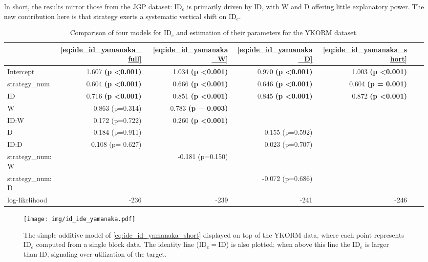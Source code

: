 \documentclass[acmlarge, manuscript,review]{acmart}
\newcommand{\ide}{\ensuremath{{\text{ID}_e}}\xspace}
\begin{document}
In short, the results mirror those from the JGP dataset: \ide is primarily driven by ID, with W and D offering little explanatory power. The new contribution here is that strategy exerts a systematic vertical shift on \ide.



\begin{table}[htbp]
\begin{center}
	\caption{Comparison of four models for \ide and estimation of their parameters for the YKORM dataset.}
	\label{tab:ide_id_yamanaka}
	\begin{tabular}{lrrrrrr}
	\hline
				  &  \autoref{eq:ide_id_yamanaka_full} & \autoref{eq:ide_id_yamanaka_W} &      \autoref{eq:ide_id_yamanaka_D} & \autoref{eq:ide_id_yamanaka_short} \\
	\hline
	Intercept     &  1.607 \textbf{(p \textless 0.001)} &    1.034 \textbf{(p \textless 0.001)} &  0.970 \textbf{(p \textless 0.001)} &  1.003 \textbf{(p \textless 0.001)}\\
	strategy\_num &  0.604 \textbf{(p \textless 0.001)} &    0.666 \textbf{(p \textless 0.001)} & 0.646 \textbf{(p \textless 0.001)} & 0.604 \textbf{(p = 0.001)} \\
	ID            &  0.716  \textbf{(p \textless 0.001)} &    0.851 \textbf{(p \textless 0.001)} & 0.845 \textbf{(p \textless 0.001)}& 0.872 \textbf{(p \textless 0.001)}  \\
	W             & -0.863 (p=0.314) &  -0.783 \textbf{(p = 0.003)}   &  &    \\
	ID:W          &  0.172 (p=0.722) &    0.260 \textbf{(p \textless 0.001)} &    &        \\
	D             & -0.184 (p=0.911)&     & 0.155 (p=0.592) &  \\
	ID:D          &  0.108 (p= 0.627) &     &  0.023 (p=0.707) &    \\
	strategy\_num:W & & -0.181 (p=0.150) & & \\
	strategy\_num:D & &   & -0.072 (p=0.686) & \\
	log-likelihood & -236 & -239 & -241 & -246 \\
	\hline
	\end{tabular}
	\end{center}
\end{table}



\begin{figure}[htbp]
	\centering
	\texttt{[image: img/id\_ide\_yamanaka.pdf]}
	\caption{The simple additive model of \autoref{eq:ide_id_yamanaka_short} displayed on top of the YKORM data, where each point represents \ide computed from a single block data. The identity line ($\ide = \text{ID}$) is also plotted; when above this line the \ide is larger than ID, signaling over-utilization of the target.}
	\label{fig:id_ide_yamanaka}
\end{figure}
\end{document}
